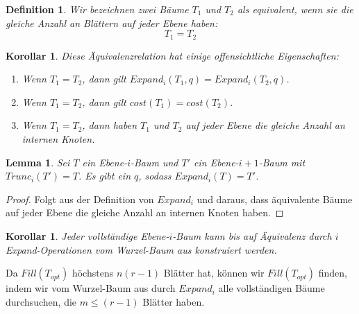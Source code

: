 \documentclass[a4paper,10pt,ngerman]{scrartcl}
\newtheorem{definition}[satz]{Definition}
\newtheorem{lemma}[satz]{Lemma}
\newtheorem{korollar}[satz]{Korollar}
\begin{document}
    \begin{definition}
        Wir bezeichnen zwei Bäume $T_1$ und $T_2$ als equivalent, wenn sie die gleiche Anzahl an Blättern auf jeder Ebene haben:
        \[T_1 = T_2\]
    \end{definition}
    \begin{korollar}
        Diese Äquivalenzrelation hat einige offensichtliche Eigenschaften:
        \begin{enumerate}
            \item Wenn $T_1 = T_2$, dann gilt $Expand_i(T_1, q) = Expand_i(T_2, q)$.
            \item Wenn $T_1 = T_2$, dann gilt $cost(T_1) = cost(T_2)$.
            \item Wenn $T_1 = T_2$, dann haben $T_1$ und $T_2$ auf jeder Ebene die gleiche Anzahl an internen Knoten.
        \end{enumerate}
    \end{korollar}
    \begin{lemma}
        Sei $T$ ein Ebene-$i$-Baum und $T'$ ein Ebene-$i+1$-Baum mit $Trunc_i(T') = T$.
        Es gibt ein $q$, sodass $Expand_i(T) = T'$.
    \end{lemma}
    \begin{proof}
        Folgt aus der Definition von $Expand_i$ und daraus, dass äquivalente Bäume auf jeder Ebene die gleiche Anzahl an internen Knoten haben.
    \end{proof}
    \begin{korollar}
        \label{lem:funktioniert}
        Jeder vollständige Ebene-$i$-Baum kann bis auf Äquivalenz durch $i$ Expand-Operationen vom Wurzel-Baum aus konstruiert werden.
    \end{korollar}
    Da $Fill(T_{opt})$ höchstens $n (r -1)$ Blätter hat, können wir $Fill(T_{opt})$ finden, indem wir vom Wurzel-Baum aus
    durch $Expand_i$ alle vollständigen Bäume durchsuchen, die $m \le (r - 1)$ Blätter haben.
\end{document}
